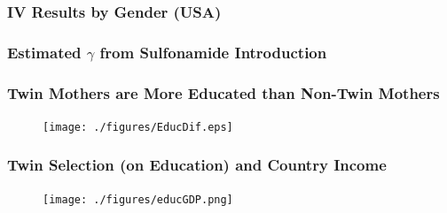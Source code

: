 \documentclass[9pt,letterpaper,subeqn]{beamer}
\begin{document}
\begin{frame}[label=USAGender]
  \frametitle{IV Results by Gender (USA)}

\hyperlink{USAIV}{}
\end{frame}


\begin{frame}[label=gammaEst]
  \frametitle{Estimated $\gamma$ from Sulfonamide Introduction}

\hyperlink{gammaDiscuss}{}
\end{frame}

\frame{
\begin{center}
\Large \textcolor{blue}{Appendix Figures}
\end{center}
}


\begin{frame}[label=EducTwin]
\frametitle{Twin Mothers are More Educated than Non-Twin Mothers}
\begin{figure}[htpb!]
\centering
  \texttt{[image: ./figures/EducDif.eps]}
\end{figure}
\hyperlink{HealthTwin}{}
\end{frame}

\begin{frame}[label=EducGDP]
\frametitle{Twin Selection (on Education) and Country Income}
\begin{figure}[htpb!]
\centering
  \texttt{[image: ./figures/educGDP.png]}
\end{figure}
\hyperlink{HealthGDP}{}
\end{frame}
\end{document}
